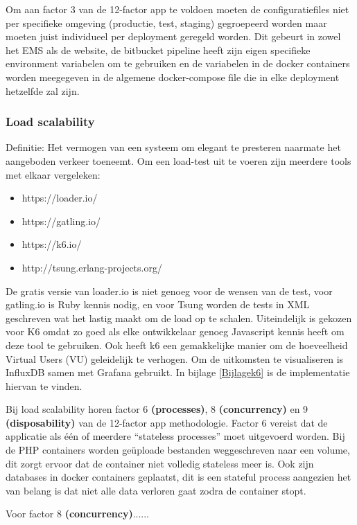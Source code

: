 Om aan factor 3 van de 12-factor app te voldoen moeten de configuratiefiles niet per specifieke omgeving (productie, test, staging) gegroepeerd worden maar moeten juist individueel per deployment geregeld worden. Dit gebeurt in zowel het EMS als de website, de bitbucket pipeline heeft zijn eigen specifieke environment variabelen om te gebruiken en de variabelen in de docker containers worden meegegeven in de algemene docker-compose file die in elke deployment hetzelfde zal zijn.

\subsubsection{Load scalability}
Definitie: Het vermogen van een systeem om elegant te presteren naarmate het aangeboden verkeer toeneemt. Om een load-test uit te voeren zijn meerdere tools met elkaar vergeleken:
\begin{itemize}
	\item https://loader.io/
	\item https://gatling.io/
	\item https://k6.io/
	\item http://tsung.erlang-projects.org/
\end{itemize}

De gratis versie van loader.io is niet genoeg voor de wensen van de test, voor gatling.io is Ruby kennis nodig, en voor Tsung worden de tests in XML geschreven wat het lastig maakt om de load op te schalen. Uiteindelijk is gekozen voor K6 omdat zo goed als elke ontwikkelaar genoeg Javascript kennis heeft om deze tool te gebruiken. Ook heeft k6 een gemakkelijke manier om de hoeveelheid Virtual Users (VU) geleidelijk te verhogen. Om de uitkomsten te visualiseren is InfluxDB samen met Grafana gebruikt. In bijlage \ref{Bijlagek6} is de implementatie hiervan te vinden.

Bij load scalability horen factor 6 \textbf{(processes)}, 8 \textbf{(concurrency)} en 9 \textbf{(disposability)} van de 12-factor app methodologie. Factor 6 vereist dat de applicatie als één of meerdere \enquote{stateless processes} moet uitgevoerd worden. Bij de PHP containers worden geüploade bestanden weggeschreven naar een volume, dit zorgt ervoor dat de container niet volledig stateless meer is. Ook zijn databases in docker containers geplaatst, dit is een stateful process aangezien het van belang is dat niet alle data verloren gaat zodra de container stopt.

Voor factor 8 \textbf{(concurrency)}......

